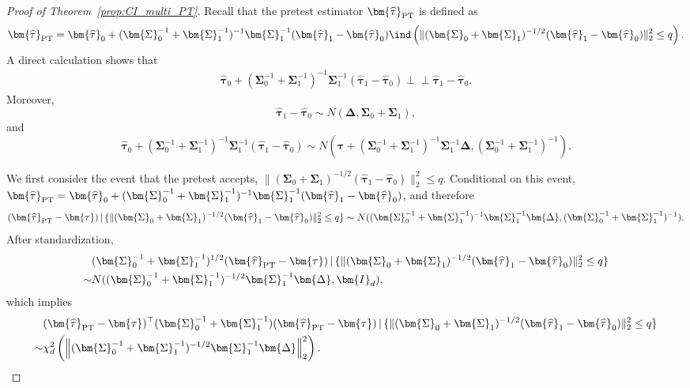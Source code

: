 \documentclass[11pt]{article}
\def\given{\,|\,}
\newcommand{\indep}{\perp \!\!\!\perp}
\newcommand{\htau}{\widehat\tau}
\numberwithin{equation}{section}
\theoremstyle{definition}
\begin{document}
\begin{proof}[Proof of Theorem~\ref{prop:CI_multi_PT}]
Recall that the pretest estimator $\bm{\htau}_{\rm PT}$ is defined as
\[
  \bm{\htau}_{\rm PT} = \bm{\htau}_0 + (\bm{\Sigma}_0^{-1} + \bm{\Sigma}_1^{-1})^{-1} \bm{\Sigma}_1^{-1} (\bm{\htau}_1 - \bm{\htau}_0) \ind\left(\lVert (\bm{\Sigma}_0+ \bm{\Sigma}_1)^{-1/2}(\bm{\htau}_1 - \bm{\htau}_0) \rVert_2^2 \le q\right).
\]
A direct calculation shows that
\begin{align*}
  \bm{\htau}_0 + (\bm{\Sigma}_0^{-1} + \bm{\Sigma}_1^{-1})^{-1} \bm{\Sigma}_1^{-1} (\bm{\htau}_1 - \bm{\htau}_0) \indep \bm{\htau}_1 - \bm{\htau}_0.
\end{align*}
Moreover,
\[
  \bm{\htau}_1 - \bm{\htau}_0 \sim N(\bm{\Delta}, \bm{\Sigma}_0+ \bm{\Sigma}_1),
\]
and
\[
  \bm{\htau}_0 + (\bm{\Sigma}_0^{-1} + \bm{\Sigma}_1^{-1})^{-1} \bm{\Sigma}_1^{-1} (\bm{\htau}_1 - \bm{\htau}_0) \sim N(\bm{\tau} + (\bm{\Sigma}_0^{-1} + \bm{\Sigma}_1^{-1})^{-1} \bm{\Sigma}_1^{-1} \bm{\Delta}, (\bm{\Sigma}_0^{-1} + \bm{\Sigma}_1^{-1})^{-1} ).
\]

We first consider the event that the pretest accepts, $\lVert (\bm{\Sigma}_0+ \bm{\Sigma}_1)^{-1/2}(\bm{\htau}_1 - \bm{\htau}_0) \rVert_2^2 \le q$. Conditional on this event, $\bm{\htau}_{\rm PT} = \bm{\htau}_0 + (\bm{\Sigma}_0^{-1} + \bm{\Sigma}_1^{-1})^{-1} \bm{\Sigma}_1^{-1} (\bm{\htau}_1 - \bm{\htau}_0) $, and therefore
\begin{align*}
  (\bm{\htau}_{\rm PT} - \bm{\tau}) \given \{\lVert (\bm{\Sigma}_0+ \bm{\Sigma}_1)^{-1/2}(\bm{\htau}_1 - \bm{\htau}_0) \rVert_2^2 \le q\} \sim N((\bm{\Sigma}_0^{-1} + \bm{\Sigma}_1^{-1})^{-1} \bm{\Sigma}_1^{-1} \bm{\Delta}, (\bm{\Sigma}_0^{-1} + \bm{\Sigma}_1^{-1})^{-1} ).
\end{align*}
After standardization,
\begin{align*}
  &(\bm{\Sigma}_0^{-1} + \bm{\Sigma}_1^{-1})^{1/2} (\bm{\htau}_{\rm PT} - \bm{\tau}) \given \{\lVert (\bm{\Sigma}_0+ \bm{\Sigma}_1)^{-1/2}(\bm{\htau}_1 - \bm{\htau}_0) \rVert_2^2 \le q\} \\
  \sim& N((\bm{\Sigma}_0^{-1} + \bm{\Sigma}_1^{-1})^{-1/2} \bm{\Sigma}_1^{-1} \bm{\Delta}, \bm{I}_d),
\end{align*}
which implies
\begin{align*}
  &(\bm{\htau}_{\rm PT} - \bm{\tau})^\top (\bm{\Sigma}_0^{-1} + \bm{\Sigma}_1^{-1}) (\bm{\htau}_{\rm PT} - \bm{\tau}) \given \{\lVert (\bm{\Sigma}_0+ \bm{\Sigma}_1)^{-1/2}(\bm{\htau}_1 - \bm{\htau}_0) \rVert_2^2 \le q\} \\
  \sim& \chi^2_d\left(\left\lVert (\bm{\Sigma}_0^{-1} + \bm{\Sigma}_1^{-1})^{-1/2} \bm{\Sigma}_1^{-1} \bm{\Delta}\right\rVert_2^2\right).
\end{align*}


\end{proof}
\end{document}
